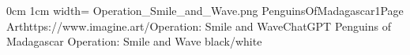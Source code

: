 \documentclass[letterpaper,openany,twoside,twocolumn]{book}
\begin{document}
	\DungeonSheetGeometry	
		{0cm}%
		{1cm}%
		{width=\paperwidth}%
		{Operation_Smile_and_Wave.png}%
		{%
			{PenguinsOfMadagascar1}{Page \thepage}{Art}{https://www.imagine.art/}{Operation: Smile and Wave}{ChatGPT}%
		}%
		{Penguins of Madagascar}%
		{Operation: Smile and Wave}%
		{black/white}%
	\clearpage
	\tableofcontents
	
\end{document}
